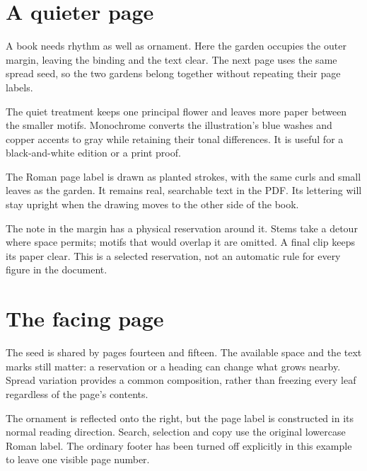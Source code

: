 \documentclass[11pt,a4paper,twoside]{article}
\begin{document}
\section{A quieter page}
A book needs rhythm as well as ornament. Here the garden occupies the outer
margin, leaving the binding and the text clear. The next page uses the same
spread seed, so the two gardens belong together without repeating their page labels.

The quiet treatment keeps one principal flower and leaves more paper between
the smaller motifs. Monochrome converts the illustration's blue washes and
copper accents to gray while retaining their tonal differences. It is useful
for a black-and-white edition or a print proof.

The Roman page label is drawn as planted strokes, with the same curls and small
leaves as the garden. It remains real, searchable text in the PDF. Its lettering
will stay upright when the drawing moves to the other side of the book.

\florilegiumdivider

The note in the margin has a physical reservation around it. Stems take a detour
where space permits; motifs that would overlap it are omitted. A final clip
keeps its paper clear. This is a selected reservation, not an automatic rule
for every figure in the document.

\florilegiumreserve[3mm]{10mm}{108mm}{31mm}{36mm}
\clearpage

\section{The facing page}
The seed is shared by pages fourteen and fifteen. The available space and the
text marks still matter: a reservation or a heading can change what grows
nearby. Spread variation provides a common composition, rather than freezing
every leaf regardless of the page's contents.

The ornament is reflected onto the right, but the page label is constructed in
its normal reading direction. Search, selection and copy use the original
lowercase Roman label. The ordinary footer has been turned off explicitly in
this example to leave one visible page number.
\end{document}
